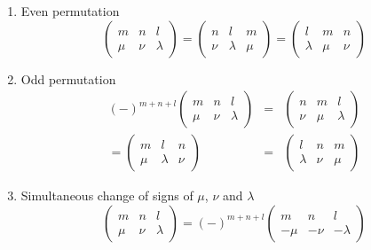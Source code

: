 \begin{enumerate}
\item Even permutation
\begin{equation}
\left(\begin{array}{ccc}
m & n & l\\
\mu & \nu & \lambda
\end{array}\right)=\left(\begin{array}{ccc}
n & l & m\\
\nu & \lambda & \mu
\end{array}\right)=\left(\begin{array}{ccc}
l & m & n\\
\lambda & \mu & \nu
\end{array}\right)
\end{equation}

\item Odd permutation
\begin{eqnarray}
\left(-\right)^{m+n+l}\left(\begin{array}{ccc}
m & n & l\\
\mu & \nu & \lambda
\end{array}\right) & = & \left(\begin{array}{ccc}
n & m & l\\
\nu & \mu & \lambda
\end{array}\right)\nonumber \\
=\left(\begin{array}{ccc}
m & l & n\\
\mu & \lambda & \nu
\end{array}\right) & = & \left(\begin{array}{ccc}
l & n & m\\
\lambda & \nu & \mu
\end{array}\right)
\end{eqnarray}

\item Simultaneous change of signs of $\mu$, $\nu$ and $\lambda$
\begin{equation}
\left(\begin{array}{ccc}
m & n & l\\
\mu & \nu & \lambda
\end{array}\right)=\left(-\right)^{m+n+l}\left(\begin{array}{ccc}
m & n & l\\
-\mu & -\nu & -\lambda
\end{array}\right)
\end{equation}

\end{enumerate}


